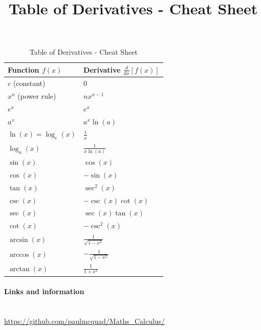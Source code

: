 \documentclass[10pt,lucida]{article}
\title{\textbf{Table of Derivatives - Cheat Sheet}}
\author{}
\date{}
\newcommand{\sectiontitle}[1]{\paragraph{#1} \ \\} %
\begin{document}
	
	\begin{table}[htbp]
		\centering
		\caption{Table of Derivatives - Cheat Sheet}
		\begin{tabular}{ll}
			\toprule
			\textbf{Function $f(x)$} & \textbf{Derivative $\frac{d}{dx}[f(x)]$} \\
			\midrule
			$c$ (constant) & $0$ \\
			$x^n$ (power rule) & $nx^{n-1}$ \\
			$e^x$ & $e^x$ \\
			$a^x$ & $a^x \ln(a)$ \\
			$\ln(x) = \log_e(x)$ & $\frac{1}{x}$ \\
			$\log_a(x)$ & $\frac{1}{x \ln(a)}$ \\
			\midrule
			$\sin(x)$ & $\cos(x)$ \\
			$\cos(x)$ & $-\sin(x)$ \\
			$\tan(x)$ & $\sec^2(x)$ \\
			$\csc(x)$ & $-\csc(x)\cot(x)$ \\
			$\sec(x)$ & $\sec(x)\tan(x)$ \\
			$\cot(x)$ & $-\csc^2(x)$ \\
			\midrule
			$\arcsin(x)$ & $\frac{1}{\sqrt{1-x^2}}$ \\
			$\arccos(x)$ & $-\frac{1}{\sqrt{1-x^2}}$ \\
			$\arctan(x)$ & $\frac{1}{1+x^2}$ \\
			\bottomrule
		\end{tabular}
	\end{table}
	
	
	\sectiontitle{Links and information}
	
	\url{https://github.com/paulmcquad/Maths_Calculus/}
	
\end{document}
